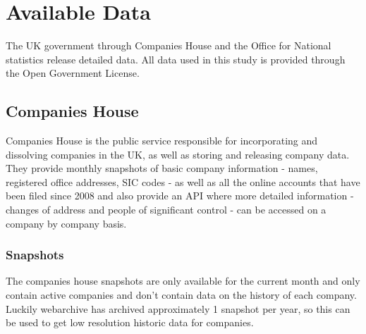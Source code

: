 \documentclass[a4paper,10pt]{article}
\begin{document}
   \section{Available Data}
   The UK government through Companies House and the Office for National statistics release detailed data. All data used in this study is provided through the Open Government License.
   \subsection{Companies House}
   Companies House is the public service responsible for incorporating and dissolving companies in the UK, as well as storing and releasing company data. They provide monthly snapshots of basic company information - names, registered office addresses, SIC codes - as well as all the online accounts that have been filed since 2008 and also provide an API where more detailed information - changes of address and people of significant control - can be accessed on a company by company basis.
   \subsubsection{Snapshots}
   The companies house snapshots \cite{companieshousesnapshots} are only available for the current month and only contain active companies and don't contain data on the history of each company. Luckily webarchive \cite{snapshotarchive} has archived approximately 1 snapshot per year, so this can be used to get low resolution historic data for companies. 
\end{document}
